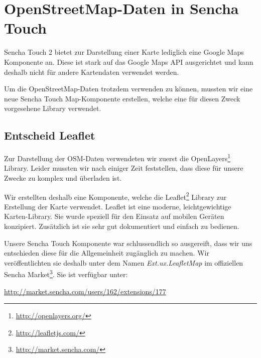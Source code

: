 \chapter{OpenStreetMap-Daten in Sencha Touch}
\label{leaflet-sencha-komponente}

Sencha Touch 2 bietet zur Darstellung einer Karte lediglich eine Google Maps Komponente an.
Diese ist stark auf das Google Maps API ausgerichtet und kann deshalb nicht für andere Kartendaten verwendet werden.

Um die OpenStreetMap-Daten trotzdem verwenden zu können, mussten wir eine neue Sencha Touch Map-Komponente erstellen, welche eine für diesen Zweck vorgesehene Library verwendet.

\section{Entscheid Leaflet}

Zur Darstellung der OSM-Daten verwendeten wir zuerst die OpenLayers\footnote{\url{http://openlayers.org/}} Library.
Leider mussten wir nach einiger Zeit feststellen, dass diese für unsere Zwecke zu komplex und überladen ist.

Wir erstellten deshalb eine Komponente, welche die Leaflet\footnote{\url{http://leafletjs.com/}} Library zur Erstellung der Karte verwendet.
Leaflet ist eine moderne, leichtgewichtige Karten-Library.
Sie wurde speziell für den Einsatz auf mobilen Geräten konzipiert.
Zusätzlich ist sie sehr gut dokumentiert und einfach zu bedienen.

Unsere Sencha Touch Komponente war schlussendlich so ausgereift, dass wir uns entschieden diese für die Allgemeinheit zugänglich zu machen.
Wir veröffentlichten sie deshalb unter dem Namen \emph{Ext.ux.LeafletMap} im offiziellen Sencha Market\footnote{\url{http://market.sencha.com/}}. Sie ist verfügbar unter:

\center \url{http://market.sencha.com/users/162/extensions/177}
